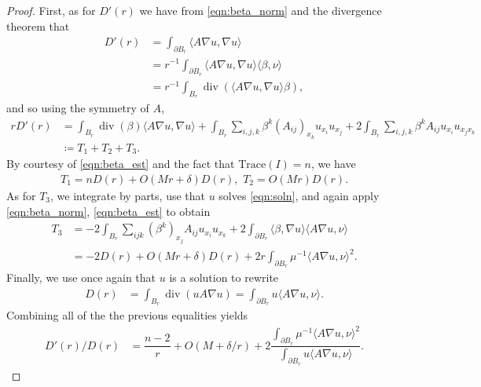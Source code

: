 \documentclass[10pt,a4paper]{amsart}
\DeclareMathOperator{\divv}{\mathrm{div}}
\begin{document}
\begin{proof}
		First, as for $D'(r)$ we have from \eqref{eqn:beta_norm} and the divergence theorem that
		\begin{align*}
			D'(r) & = \int_{\partial B_r} \langle A \nabla u, \nabla u \rangle \\
			& = r^{-1} \int_{\partial B_r} \langle A \nabla u, \nabla u \rangle \langle \beta, \nu \rangle  \\
			& = r^{-1} \int_{B_r} \divv( \langle A \nabla u, \nabla u \rangle \beta ) ,
		\end{align*}
		and so using the symmetry of $A$,
		\begin{align*}
			rD'(r) & = \int_{B_r} \divv(\beta) \langle A \nabla u, \nabla u \rangle + \int_{B_r} \sum_{i,j,k} \beta^k (A_{ij})_{x_k} u_{x_i} u_{x_j} + 2 \int_{B_r} \sum_{i,j,k} \beta^k  A_{ij} u_{x_i} u_{x_j x_k} \\
			& \coloneqq T_1 + T_2 + T_3.
		\end{align*}
		By courtesy of \eqref{eqn:beta_est} and the fact that $\mathrm{Trace}(I) = n$, we have
		\begin{align*}
			T_1 = n D(r) + O(M r + \delta) D(r) , \,\, T_2 = O(M r) D(r).
		\end{align*}
		As for $T_3$, we integrate by parts, use that $u$ solves \eqref{eqn:soln}, and again apply \eqref{eqn:beta_norm}, \eqref{eqn:beta_est} to obtain 
		\begin{align*}
			T_3 & = -2 \int_{B_r} \sum_{ijk} (\beta^k)_{x_j} A_{ij} u_{x_i} u_{x_k} + 2 \int_{\partial B_r} \langle \beta, \nabla u \rangle \langle A \nabla u, \nu \rangle \\
			& = -2 D(r) + O(Mr + \delta) D(r) + 2r \int_{\partial B_r} \mu^{-1} \langle A \nabla u, \nu \rangle^2 .
		\end{align*}
		Finally, we use once again that $u$ is a solution to rewrite
		\begin{align}\label{eqn:D}
			D(r) & = \int_{B_r} \divv(u A \nabla u)  = \int_{\partial B_r} u \langle A \nabla u, \nu\rangle. 
		\end{align}
		Combining all of the the previous equalities yields
		\begin{align}\label{eqn:D'}
			D'(r)/D(r) & = \dfrac{n-2}{r} + O(M + \delta/r) + 2 \dfrac{ \int_{\partial B_r} \mu^{-1} \langle A \nabla u, \nu \rangle^2  }{  \int_{\partial B_r} u \langle A \nabla u, \nu \rangle   }.
		\end{align} 
		

\end{proof}
\end{document}
